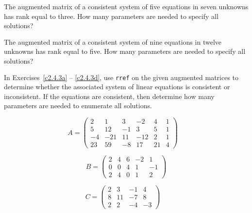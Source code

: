 \documentclass{ximera}
\begin{document}
\begin{exercise} \label{c2.4.2}
The augmented matrix of a consistent system of five equations in seven
unknowns has rank equal to three.  How many parameters are needed to
specify all solutions?
\end{exercise}

\begin{exercise} \label{c2.4.2b}
The augmented matrix of a consistent system of nine equations in twelve
unknowns has rank equal to five.  How many parameters are needed to
specify all solutions?
\end{exercise}




\CEXER

\noindent In Exercises~\ref{c2.4.3a} -- \ref{c2.4.3d}, use {\tt rref} on
the given augmented matrices to determine whether the associated system of
linear equations is consistent or inconsistent.  If the equations are
consistent, then determine how many parameters are needed to enumerate
all solutions.
\begin{exercise} \label{c2.4.3a}
\begin{equation*}
A = \left(\begin{array}{rrrrr|r}
2 & 1 & 3 & -2 & 4 & 1 \\
5 & 12 & -1 & 3 & 5 & 1 \\
-4  &  -21 &    11  &  -12  &    2  &    1  \\
23  &  59  &  -8   & 17  &  21  &   4
\end{array}\right) \quad
\end{equation*}
\end{exercise}
\begin{exercise} \label{c2.4.3b}
\begin{equation*}
B = \left(\begin{array}{rrrr|r}
     2   &  4  & 6  &  -2   &  1 \\
     0   &  0   &  4  &   1  &  -1\\
     2   &  4   &  0   &  1  &   2
\end{array}\right)\end{equation*}
\end{exercise}
\begin{exercise} \label{c2.4.3c}
\begin{equation*}
C = \left(\begin{array}{rrr|r}
     2  &   3  &  -1  &   4 \\
     8  &  11  &  -7  &   8\\
     2  &   2  &  -4  &  -3
\end{array}\right) \quad
\end{equation*}
\end{exercise}
\end{document}
